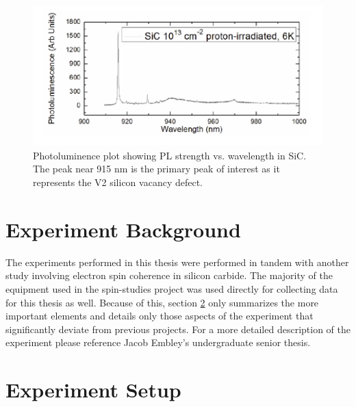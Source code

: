 \documentclass[oneside, astronomy, noacknowlegments]{BYUPhys}
\begin{document}
\begin{figure}
    \centerline{\includegraphics{sic_pl_fig}}
    \caption[Photoluminence Spectra of Silicon Carbide]{\label{fig:SiCPL}
      Photoluminence plot showing PL strength vs. wavelength in SiC. The peak near 915 nm is the primary peak of interest as it represents the V2 silicon vacancy defect.}
 \end{figure}

\section{Experiment Background}

The experiments performed in this thesis were performed in tandem with another study involving electron spin coherence in silicon carbide. The majority of the equipment used in the spin-studies project was used directly for collecting data for this thesis as well. Because of this, section \ref{sec:Experiment} only summarizes the more important elements and details only those aspects of the experiment that significantly deviate from previous projects. For a more detailed description of the experiment please reference Jacob Embley's undergraduate senior thesis. \cite{RefWorks:doc:5892912ae4b0dec22aee3993}

\section{Experiment Setup}
\label{sec:Experiment}
\end{document}
